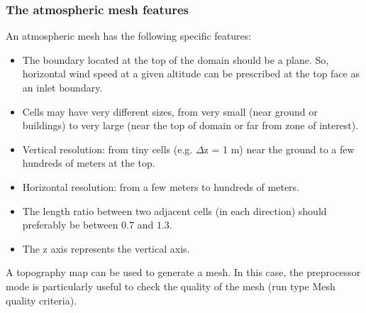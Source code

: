 \subsubsection{The atmospheric mesh features}
%
An atmospheric mesh has the following specific features:
%
\begin{itemize}
\item The boundary located at the top of the domain should be a plane.
So, horizontal wind speed at a given altitude can be prescribed at the top
face as an inlet boundary.
\item Cells may have very different sizes, from very small (near ground or
buildings) to very large (near the top of domain or far from zone of interest).
\item Vertical resolution: from tiny cells (e.g. $\Delta $\upshape z = 1 m) near
the ground to a few hundreds of meters at the top.
\item Horizontal resolution: from a few meters to hundreds of meters.
\item The length ratio between two adjacent cells (in each direction) should
preferably be between $0.7$ and $1.3$.
\item The z axis represents the vertical axis.
\end{itemize}
%
A topography map can be used to generate a mesh. In this case, the preprocessor
 mode is particularly useful to check the quality of the mesh (run type Mesh
quality criteria).
%
